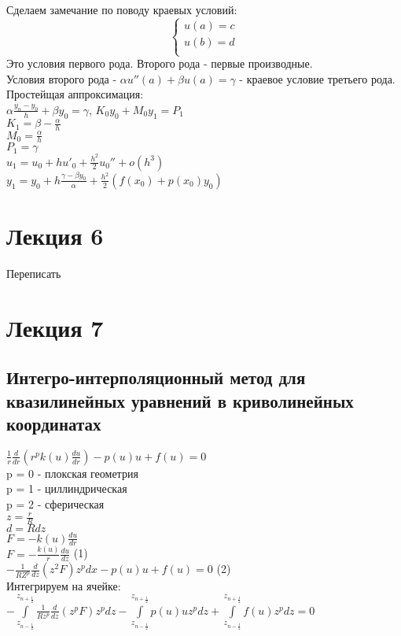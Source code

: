 Сделаем замечание по поводу краевых условий:\\
\begin{equation}
\begin{cases}
u(a) = c\\
u(b) = d\\
\end{cases}
\end{equation}
Это условия первого рода. Второго рода - первые производные.\\
Условия второго рода - $\alpha u''(a) + \beta u(a) = \gamma$ - краевое условие третьего рода.\\

Простейщая аппроксимация:\\
$\alpha\frac{y_{n} - y_{0}}{h} + \beta y_{0} = \gamma$, $K_{0} y_{0} + M_{0} y_{1} = P_{1}$\\
$K_{1} = \beta - \frac{\alpha}{h}$\\
$M_{0} = \frac{\alpha}{h}$\\
$P_{1} = \gamma$\\

$u_{1} = u_{0} + h u'_{0} + \frac{h^{2}}{2}u_{0}'' +  o(h^{3})$\\
$y_{1} = y_{0} + h \frac{\gamma - \beta y_{0}}{\alpha} + \frac{h^{2}}{2} (f(x_{0}) + p(x_{0}) y_{0})$\\

\chapter{Лекция 6}
Переписать

\chapter{Лекция 7}
\section{Интегро-интерполяционный метод для квазилинейных уравнений в криволинейных координатах}
$\frac{1}{r} \frac{d}{dr} (r^{p}k(u)\frac{du}{dr}) - p(u)u + f(u) = 0$\\
p = 0 - плокская геометрия\\
p = 1 - циллиндрическая\\
p = 2 - сферическая\\

$z = \frac{r}{R}$\\
$d = Rdz$\\
$F = -k(u)\frac{du}{dr}$\\
$F = -\frac{k(u)}{r} \frac{du}{dz}$ (1)\\
$-\frac{1}{RZ^{p}} \frac{d}{dz} (z^{2}F) z^{p} dx - p(u)u + f(u) = 0$ (2)\\
Интегрируем на ячейке:\\
$-\int\limits_{z_{n-\frac{1}{2}}}^{z_{n+\frac{1}{2}}}\frac{1}{Rz^{p}}\frac{d}{dz}(z^{p}F)z^{p}dz  - \int\limits_{z_{n-\frac{1}{2}}}^{z_{n+\frac{1}{2}}}p(u)u z^{p} dz + \int\limits_{z_{n-\frac{1}{2}}}^{z_{n+\frac{1}{2}}} f(u) z^{p} dz = 0$\\

